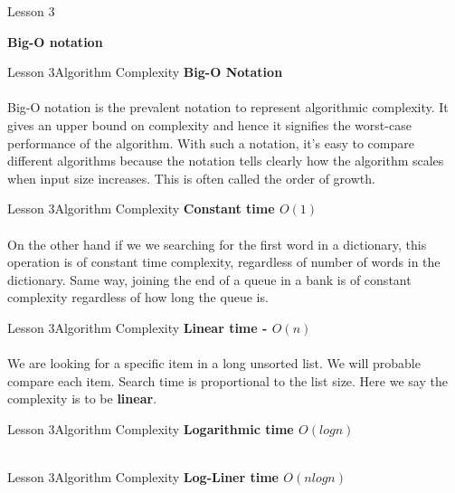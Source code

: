 \documentclass[aspectratio=1610]{beamer}
\begin{document}
\begin{frame}{Lesson 3}{}
\begin{center}
\huge \textbf{Big-O notation}
\end{center}
\end{frame}


\begin{frame}{Lesson 3}{Algorithm Complexity}
\LARGE
\textbf{Big-O Notation}\\~\\
\Large
Big-O notation is the prevalent notation to represent algorithmic complexity. 
It gives an upper bound on complexity and hence it signifies the worst-case
performance of the algorithm. With such a notation, it's easy to compare different
algorithms because the notation tells clearly how the algorithm scales when 
input size increases. This is often called the order of growth.
\end{frame}



\begin{frame}{Lesson 3}{Algorithm Complexity}
\LARGE
\textbf{Constant time $O(1)$}\\~\\
On the other hand if we we searching for the first word in a dictionary, this
operation is of constant time complexity, regardless of number of words in the
dictionary. Same way, joining the end of a queue in a bank is of constant complexity
regardless of how long the queue is.
\end{frame}

\begin{frame}{Lesson 3}{Algorithm Complexity}
\LARGE
\textbf{Linear time - $O(n)$}\\~\\
We are looking for a specific item in a long unsorted list. We will probable compare
each item. Search time is proportional to the list size. Here we say the complexity is
to be \textbf{linear}.
\end{frame}


\begin{frame}{Lesson 3}{Algorithm Complexity}
\LARGE
\textbf{Logarithmic time $O(log n)$}\\~\\
\end{frame}


\begin{frame}{Lesson 3}{Algorithm Complexity}
\LARGE
\textbf{Log-Liner time $O(n log n)$}\\~\\
\end{frame}
\end{document}
